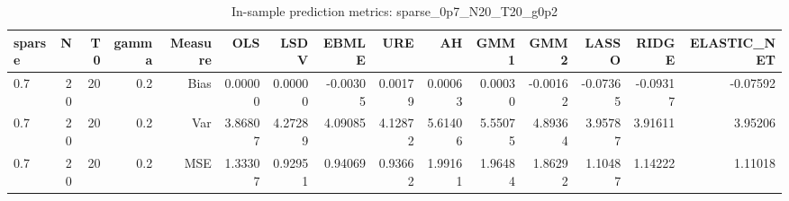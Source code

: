 \begin{table}[!htbp]\centering
\caption{In-sample prediction metrics: sparse_0p7_N20_T20_g0p2}
\label{tab:table2_sparse_0p7_N20_T20_g0p2}
\begin{tabular}{lrrrrrrrrrrrrrr}
\hline
sparse & N & T0 & gamma & Measure & OLS & LSDV & EBMLE & URE & AH & GMM1 & GMM2 & LASSO & RIDGE & ELASTIC_NET \\
\hline
0.7 & 20 & 20 & 0.2 & Bias & 0.00000 & 0.00000 & -0.00305 & 0.00179 & 0.00063 & 0.00030 & -0.00162 & -0.07365 & -0.09317 & -0.07592 \\
0.7 & 20 & 20 & 0.2 & Var & 3.86807 & 4.27289 & 4.09085 & 4.12872 & 5.61406 & 5.55075 & 4.89364 & 3.95787 & 3.91611 & 3.95206 \\
0.7 & 20 & 20 & 0.2 & MSE & 1.33307 & 0.92951 & 0.94069 & 0.93662 & 1.99161 & 1.96484 & 1.86292 & 1.10487 & 1.14222 & 1.11018 \\
\hline
\end{tabular}
\end{table}

